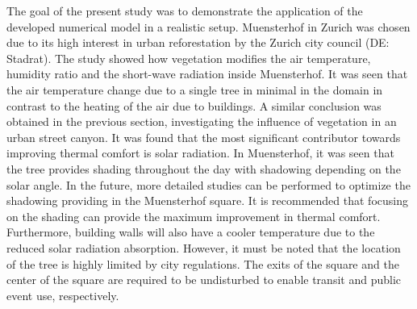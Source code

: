 The goal of the present study was to demonstrate the application of the developed numerical model in a realistic setup. Muensterhof in Zurich was chosen due to its high interest in urban reforestation by the Zurich city council (DE: Stadrat). The study showed how vegetation modifies the air temperature, humidity ratio and the short-wave radiation inside Muensterhof. It was seen that the air temperature change due to a single tree in minimal in the domain in contrast to the heating of the air due to buildings. A similar conclusion was obtained in the previous section, investigating the influence of vegetation in an urban street canyon. It was found that the most significant contributor towards improving thermal comfort is solar radiation. In Muensterhof, it was seen that the tree provides shading throughout the day with shadowing depending on the solar angle. In the future, more detailed studies can be performed to optimize the shadowing providing in the Muensterhof square. It is recommended that focusing on the shading can provide the maximum improvement in thermal comfort. Furthermore, building walls will also have a cooler temperature due to the reduced solar radiation absorption. However, it must be noted that the location of the tree is highly limited by city regulations. The exits of the square and the center of the square are required to be undisturbed to enable transit and public event use, respectively. 

